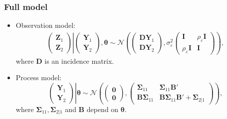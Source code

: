 \documentclass{beamer}
\newcommand{\Bmat} {\textbf{B}}
\newcommand{\Dmat} {\textbf{D}}
\newcommand{\Imat} {\textbf{I}}
\newcommand{\Yvec}{\mathbf{Y}}
\newcommand{\Zvec}{\mathbf{Z}}
\newcommand{\thetab}{\boldsymbol{\theta}}
\newcommand{\bzero}{\boldsymbol{0}}
\newcommand{\bSigma}{\bm{\Sigma}}
\begin{document}

\begin{frame}
\frametitle{Full model}

\begin{itemize}
\item Observation model:
\begin{align*}
\left.\begin{pmatrix} \Zvec_1 \\ \Zvec_2 \end{pmatrix}
\right|
\begin{pmatrix} \Yvec_1 \\ \Yvec_2 \end{pmatrix} , \thetab
\sim
\mathcal{N}\left(
\begin{pmatrix} \Dmat\Yvec_1 \\ \Dmat\Yvec_2 \end{pmatrix},
\sigma^2_\varepsilon\begin{pmatrix} \Imat & \rho_\varepsilon\Imat \\ \rho_\varepsilon\Imat & \Imat \end{pmatrix}
\right),
\end{align*}
where $\Dmat$ is an incidence matrix.
\item Process model:
\begin{equation*}
\left.\begin{pmatrix} \Yvec_1 \\ \Yvec_2 \end{pmatrix}\right| \thetab \sim \mathcal{N} 
\left(
\begin{pmatrix} \bzero \\ \bzero \end{pmatrix}, 
\begin{pmatrix}
\bSigma_{11} & \bSigma_{11}\Bmat' \\
\Bmat \bSigma_{11} & \Bmat \bSigma_{11}\Bmat' + \bSigma_{2|1}
\end{pmatrix}
\right),
\end{equation*}
\noindent where $\bSigma_{11}, \bSigma_{2|1}$ and $\Bmat$ depend on $\thetab$.
\end{itemize}
\end{frame}

\end{document}
